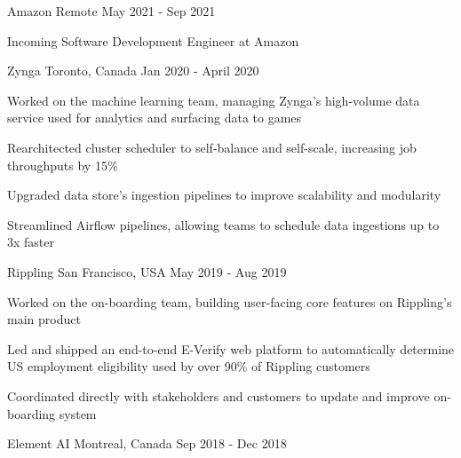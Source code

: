 \documentclass[11pt, a4paper]{awesome-cv}
\begin{document}
\makecvheader





\begin{siderules1}
\begin{cventries}
    \cventry
    {\textit{}}
    {Amazon}
    {Remote}
    {May 2021 - Sep 2021}
    {
      \begin{cvitems}
        \item {Incoming Software Development Engineer at Amazon}
      \end{cvitems}
    }
    \cventry
    {\textit{}}
    {Zynga}
    {Toronto, Canada}
    {Jan 2020 - April 2020}
    {
      \begin{cvitems}
        \item {Worked on the machine learning team, managing Zynga's high-volume data service used for analytics and surfacing data to games}
        \item {Rearchitected cluster scheduler to self-balance and self-scale, increasing job throughputs by 15\%}
        \item {Upgraded data store’s ingestion pipelines to improve scalability and modularity}
        \item {Streamlined Airflow pipelines, allowing teams to schedule data ingestions up to 3x faster}
      \end{cvitems}
    }
    \cventry
    {\textit{}}
    {Rippling}
    {San Francisco, USA}
    {May 2019 - Aug 2019}
    {
      \begin{cvitems}
        \item {Worked on the on-boarding team, building user-facing core features on Rippling’s main product}
        \item {Led and shipped an end-to-end E-Verify web platform to automatically determine US employment eligibility used by over 90\% of Rippling customers}
        \item {Coordinated directly with stakeholders and customers to update and improve on-boarding system}
      \end{cvitems}
    }
    \cventry
    {\textit{}}
    {Element AI}
    {Montreal, Canada}
    {Sep 2018 - Dec 2018}

\end{cventries}
\end{siderules1}
\end{document}
